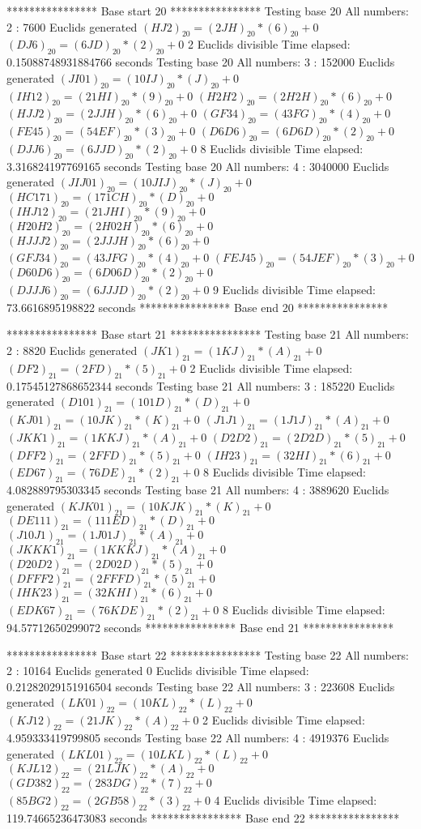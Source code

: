 **************** Base start 20 ****************
Testing base 20 All numbers: 2 :
	 7600 Euclids generated
	$(HJ2)_{20}=(2JH)_{20}*(6)_{20}+0$
	$(DJ6)_{20}=(6JD)_{20}*(2)_{20}+0$
	 2 Euclids divisible
Time elapsed: 0.15088748931884766 seconds
Testing base 20 All numbers: 3 :
	 152000 Euclids generated
	$(JI01)_{20}=(10IJ)_{20}*(J)_{20}+0$
	$(IH12)_{20}=(21HI)_{20}*(9)_{20}+0$
	$(H2H2)_{20}=(2H2H)_{20}*(6)_{20}+0$
	$(HJJ2)_{20}=(2JJH)_{20}*(6)_{20}+0$
	$(GF34)_{20}=(43FG)_{20}*(4)_{20}+0$
	$(FE45)_{20}=(54EF)_{20}*(3)_{20}+0$
	$(D6D6)_{20}=(6D6D)_{20}*(2)_{20}+0$
	$(DJJ6)_{20}=(6JJD)_{20}*(2)_{20}+0$
	 8 Euclids divisible
Time elapsed: 3.316824197769165 seconds
Testing base 20 All numbers: 4 :
	 3040000 Euclids generated
	$(JIJ01)_{20}=(10JIJ)_{20}*(J)_{20}+0$
	$(HC171)_{20}=(171CH)_{20}*(D)_{20}+0$
	$(IHJ12)_{20}=(21JHI)_{20}*(9)_{20}+0$
	$(H20H2)_{20}=(2H02H)_{20}*(6)_{20}+0$
	$(HJJJ2)_{20}=(2JJJH)_{20}*(6)_{20}+0$
	$(GFJ34)_{20}=(43JFG)_{20}*(4)_{20}+0$
	$(FEJ45)_{20}=(54JEF)_{20}*(3)_{20}+0$
	$(D60D6)_{20}=(6D06D)_{20}*(2)_{20}+0$
	$(DJJJ6)_{20}=(6JJJD)_{20}*(2)_{20}+0$
	 9 Euclids divisible
Time elapsed: 73.6616895198822 seconds
**************** Base end 20 ****************

**************** Base start 21 ****************
Testing base 21 All numbers: 2 :
	 8820 Euclids generated
	$(JK1)_{21}=(1KJ)_{21}*(A)_{21}+0$
	$(DF2)_{21}=(2FD)_{21}*(5)_{21}+0$
	 2 Euclids divisible
Time elapsed: 0.17545127868652344 seconds
Testing base 21 All numbers: 3 :
	 185220 Euclids generated
	$(D101)_{21}=(101D)_{21}*(D)_{21}+0$
	$(KJ01)_{21}=(10JK)_{21}*(K)_{21}+0$
	$(J1J1)_{21}=(1J1J)_{21}*(A)_{21}+0$
	$(JKK1)_{21}=(1KKJ)_{21}*(A)_{21}+0$
	$(D2D2)_{21}=(2D2D)_{21}*(5)_{21}+0$
	$(DFF2)_{21}=(2FFD)_{21}*(5)_{21}+0$
	$(IH23)_{21}=(32HI)_{21}*(6)_{21}+0$
	$(ED67)_{21}=(76DE)_{21}*(2)_{21}+0$
	 8 Euclids divisible
Time elapsed: 4.082889795303345 seconds
Testing base 21 All numbers: 4 :
	 3889620 Euclids generated
	$(KJK01)_{21}=(10KJK)_{21}*(K)_{21}+0$
	$(DE111)_{21}=(111ED)_{21}*(D)_{21}+0$
	$(J10J1)_{21}=(1J01J)_{21}*(A)_{21}+0$
	$(JKKK1)_{21}=(1KKKJ)_{21}*(A)_{21}+0$
	$(D20D2)_{21}=(2D02D)_{21}*(5)_{21}+0$
	$(DFFF2)_{21}=(2FFFD)_{21}*(5)_{21}+0$
	$(IHK23)_{21}=(32KHI)_{21}*(6)_{21}+0$
	$(EDK67)_{21}=(76KDE)_{21}*(2)_{21}+0$
	 8 Euclids divisible
Time elapsed: 94.57712650299072 seconds
**************** Base end 21 ****************

**************** Base start 22 ****************
Testing base 22 All numbers: 2 :
	 10164 Euclids generated
	 0 Euclids divisible
Time elapsed: 0.21282029151916504 seconds
Testing base 22 All numbers: 3 :
	 223608 Euclids generated
	$(LK01)_{22}=(10KL)_{22}*(L)_{22}+0$
	$(KJ12)_{22}=(21JK)_{22}*(A)_{22}+0$
	 2 Euclids divisible
Time elapsed: 4.959333419799805 seconds
Testing base 22 All numbers: 4 :
	 4919376 Euclids generated
	$(LKL01)_{22}=(10LKL)_{22}*(L)_{22}+0$
	$(KJL12)_{22}=(21LJK)_{22}*(A)_{22}+0$
	$(GD382)_{22}=(283DG)_{22}*(7)_{22}+0$
	$(85BG2)_{22}=(2GB58)_{22}*(3)_{22}+0$
	 4 Euclids divisible
Time elapsed: 119.74665236473083 seconds
**************** Base end 22 ****************

